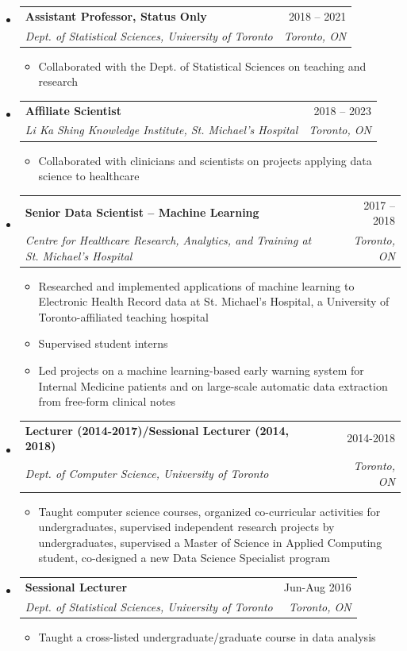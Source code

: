 \documentclass[letterpaper,11pt]{article}
\makeatletter
\newcommand{\ressubheading}[4]{
\begin{tabular*}{\linewidth}[t]{l@{\extracolsep{\fill}}r}
		\textbf{#1} & #2 \\
		\textit{\textcolor{accent}{#3}} & \textit{#4} \\
\end{tabular*}\vspace{-2pt}}
\makeatother
\begin{document}
\begin{itemize}
\item
\ressubheading{Assistant Professor, Status Only}{2018 -- 2021 }{Dept. of Statistical Sciences, University of Toronto}{Toronto, ON}
	\begin{itemize}
		\item Collaborated with the Dept. of Statistical Sciences on teaching and research
	\end{itemize}
\item
\ressubheading{Affiliate Scientist}{2018 -- 2023}{Li Ka Shing Knowledge Institute, St. Michael's Hospital}{Toronto, ON}
	\begin{itemize}
		\item Collaborated with clinicians and scientists on projects applying data science to healthcare
	\end{itemize}

\item
	\ressubheading{Senior Data Scientist -- Machine Learning}{2017 --  2018}{Centre for Healthcare Research, Analytics, and Training at St. Michael's Hospital}{Toronto, ON}
	\begin{itemize}
		\item Researched and implemented applications of machine learning to Electronic Health Record data at St. Michael's Hospital, a University of Toronto-affiliated teaching hospital
		\item Supervised student interns
		\item Led projects on a machine learning-based early warning system for Internal Medicine patients and on large-scale automatic data extraction from free-form clinical notes
	\end{itemize}

\item
	\ressubheading{Lecturer (2014-2017)/Sessional Lecturer (2014, 2018)}{2014-2018}{Dept. of Computer Science, University of Toronto}{Toronto, ON}
	\begin{itemize}
		\item Taught computer science courses, organized co-curricular activities for undergraduates, supervised independent research projects by undergraduates, supervised a Master of Science in Applied Computing student, co-designed a new Data Science Specialist program
	\end{itemize}

\item
	\ressubheading{Sessional Lecturer}{Jun-Aug 2016}{Dept. of Statistical Sciences, University of Toronto}{Toronto, ON}
	\begin{itemize}
		\item Taught a cross-listed undergraduate/graduate course in data analysis
	\end{itemize}



\end{itemize}
\end{document}
